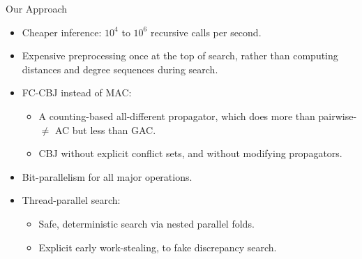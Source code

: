 \documentclass{beamer}
\begin{document}
\begin{frame}{Our Approach}
    \begin{itemize}
        \item \textcolor{uofgrose}{Cheaper inference}: $10^4$ to $10^6$ recursive calls per second.
        \item Expensive \textcolor{uofgrose}{preprocessing once} at the top of search, rather
            than computing distances and degree sequences during search.
        \item FC-CBJ instead of MAC:
            \begin{itemize}
                \item A \textcolor{uofgrose}{counting-based all-different} propagator, which does more
                    than pairwise-$\ne$ AC but less than GAC.
                \item CBJ \textcolor{uofgrose}{without explicit conflict sets}, and without modifying propagators.
            \end{itemize}
        \item \textcolor{uofgrose}{Bit-parallelism} for all major operations.
        \item \textcolor{uofgrose}{Thread-parallel} search:
            \begin{itemize}
                \item Safe, deterministic search via nested parallel folds.
                \item Explicit early work-stealing, to fake discrepancy search.
            \end{itemize}
    \end{itemize}
\end{frame}
\end{document}
